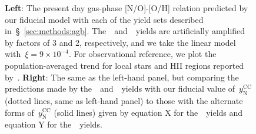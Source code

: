 \documentclass[ms.tex]{subfiles}
\begin{document}
\begin{figure}
\caption{
\textbf{Left}: The present day gas-phase [N/O]-[O/H] relation predicted by our 
fiducial model with each of the yield sets described 
in~\S~\ref{sec:methods:agb}. 
The~\cristallo~and~\ventura~yields are artificially amplified by factors of 
3 and 2, respectively, and we take the linear model with~$\xi = 9\times10^{-4}$. 
For observational reference, we plot the population-averaged trend for local 
stars and HII regions reported by~\citet{Dopita2016}. 
\textbf{Right}: The same as the left-hand panel, but comparing the predictions 
made by the~\karakasten~and~\karakas~yields with our fiducial value 
of~$y_\text{N}^\text{CC}$ (dotted lines, same as left-hand panel) to those with 
the alternate forms of~$y_\text{N}^\text{CC}$ (solid lines) given by equation X 
for the~\karakasten~yields and equation Y for the~\karakas~yields. 
} 
\label{fig:no_oh_predictions} 
\end{figure} 
\end{document}
